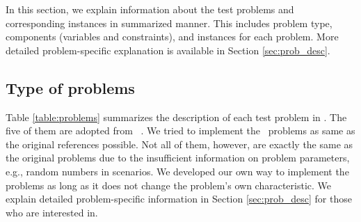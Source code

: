 In this section, we explain information about the test problems and corresponding instances in summarized manner. This includes problem type, components (variables and constraints), and instances for each problem. More detailed problem-specific explanation is available in Section \ref{sec:prob_desc}.
\subsection{Type of problems}
Table \ref{table:problems} summarizes the description of each test problem in \siplibtwo. The five of them are adopted from \siplib\ \cite{web:SIPLIB1}. We tried to implement the \siplib\ problems as same as the original references possible. Not all of them, however, are exactly the same as the original problems due to the insufficient information on problem parameters, e.g., random numbers in scenarios. We developed our own way to implement the problems as long as it does not change the problem's own characteristic. We explain detailed problem-specific information in Section \ref{sec:prob_desc} for those who are interested in.
\begin{table}[H]
	\centering
	\caption{Test problems in \texttt{SIPLIB 2.0}}
	\label{table:problems}
\end{table}


